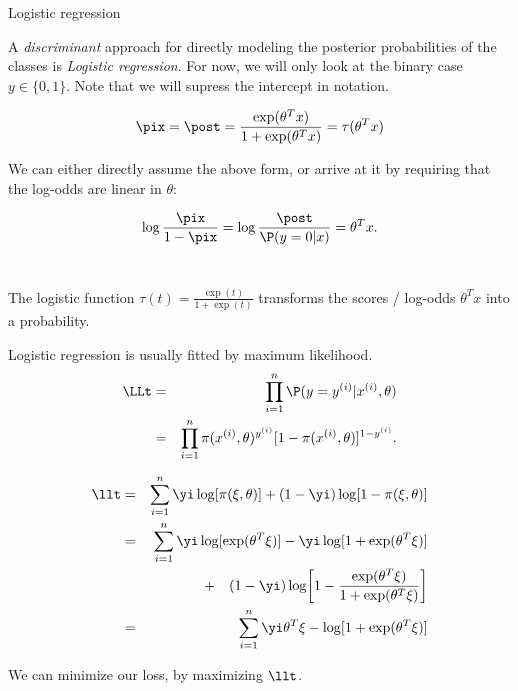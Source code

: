 \begin{vbframe}{Logistic regression}

A \emph{discriminant} approach for directly modeling the posterior probabilities of the classes is \emph{Logistic regression}. For now, we will only look at the binary case $y \in \{0, 1\}$.
Note that we will supress the intercept in notation.

$$
\pix = \post = \frac{\exp(\theta^Tx)}{1+\exp(\theta^Tx)} = \tau(\theta^T x)
$$

We can either directly assume the above form, or arrive at it by requiring that the log-odds
are linear in $\theta$:

$$
\log \frac{\pix}{1-\pix} = \log\frac{\post}{\P(y = 0 | x)} = \theta^Tx.
$$\

\lz

The logistic function $\tau(t) = \frac{\exp(t)}{1 + \exp(t)}$
transforms the scores / log-odds $\theta^Tx$ into a probability.



\framebreak

Logistic regression is usually fitted by maximum likelihood.
\begin{eqnarray*}
\LLt &=& \prod_{i=1}^n \P(y = y^{(i)} | x^{(i)}, \theta) \\
&=& \prod_{i=1}^n \pi(x^{(i)}, \theta)^{y^{(i)}} [1 - \pi(x^{(i)}, \theta)]^{1 - y^{(i)}}.
\end{eqnarray*}



\small
\begin{eqnarray*}
\llt
&=& \sum_{i=1}^n \yi \log[\pi(\xi, \theta)] + (1-\yi) \log [1 - \pi(\xi, \theta)]\\
&=& \sum_{i=1}^n \yi \log [\exp(\theta^T \xi)] - \yi \log[1 + \exp(\theta^T \xi)] \\
&\quad& + \quad (1 - \yi) \log \biggl[1 - \frac{\exp(\theta^T \xi)}{1 + \exp(\theta^T \xi)}\biggr]\\
&=& \sum_{i=1}^n \yi \theta^T \xi - \log[1 + \exp(\theta^T \xi)]
\end{eqnarray*}

\framebreak

\normalsize
We can minimize our loss, by maximizing $\llt$.


\end{vbframe}

